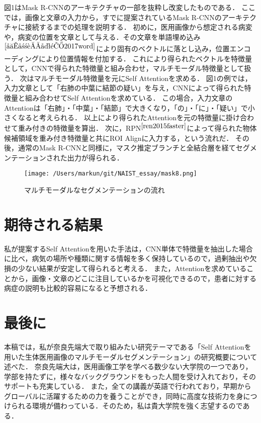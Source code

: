 \documentclass[a4j,10pt,twocolumn]{jarticle}
\begin{document}
図1はMask R-CNNのアーキテクチャの一部を抜粋し改変したものである．
ここでは，画像と文章の入力から，すでに提案されているMask R-CNNのアーキテクチャに接続するまでの処理を説明する．
初めに，医用画像から想定される病変や，病変の位置を文章として与える．その文章を単語埋め込み{$^{\cite{堅山耀太郎2017word}}$}により固有のベクトルに落とし込み，位置エンコーディングにより位置情報を付加する．
これにより得られたベクトルを特徴量として，CNNで得られた特徴量と組み合わせ，マルチモーダル特徴量として扱う．
次はマルチモーダル特徴量を元にSelf Attentionを求める．
図1の例では，入力文章として「右肺の中葉に結節の疑い」を与え，CNNによって得られた特徴量と組み合わせてSelf Attentionを求めている．
この場合，入力文章のAttentionは「右肺」・「中葉」・「結節」で大きくなり，「の」・「に」・「疑い」で小さくなると考えられる．
以上により得られたAttentionを元の特徴量に掛け合わせて重み付きの特徴量を算出．
次に，RPN{$^{\cite{ren2015faster}}$}によって得られた物体候補領域を重み付き特徴量と共にROI Alignに入力する，という流れだ．
その後，通常のMask R-CNNと同様に，マスク推定ブランチと全結合層を経てセグメンテーションされた出力が得られる．
\begin{figure}[hb]%
    \centering\texttt{[image: /Users/markun/git/NAIST\_essay/mask8.png]}
    \caption{マルチモーダルなセグメンテーションの流れ}
\end{figure}
\vspace{-1zh}
\section{期待される結果}
私が提案するSelf Attentionを用いた手法は，CNN単体で特徴量を抽出した場合に比べ，病気の場所や種類に関する情報を多く保持しているので，過剰抽出や欠損の少ない結果が安定して得られると考える．
また，Attentionを求めていることから，画像・文章のどこに注目しているかを可視化できるので，患者に対する病症の説明も比較的容易になると予想される．

\section{最後に}
本稿では，私が奈良先端大で取り組みたい研究テーマである「Self Attentionを用いた生体医用画像のマルチモーダルセグメンテーション」の研究概要について述べた．
奈良先端大は，医用画像工学を学べる数少ない大学院の一つであり，学部を持たずに，様々なバックグラウンドをもった人間を受け入れており，そのサポートも充実している．
また，全ての講義が英語で行われており，早期からグローバルに活躍するための力を養うことができ，同時に高度な技術力を身につけられる環境が備わっている．そのため，私は貴大学院を強く志望するのである．

{\scriptsize


\makeatletter
 \renewcommand{\@cite}[2]{\leavevmode%
 \hbox{$^{\mbox{\the\scriptfont0 #1}}$}}
\makeatother
}
\end{document}
